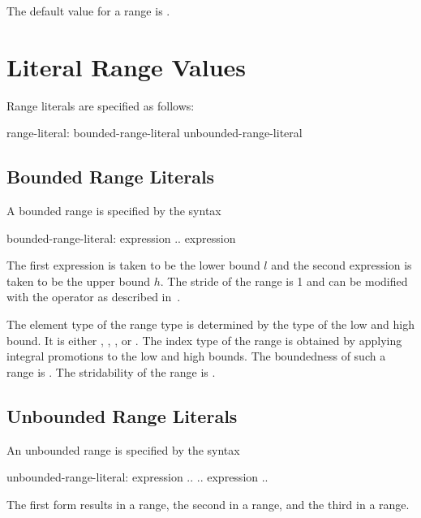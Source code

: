 The default value for a range is .

\section{Literal Range Values}
\label{Range_Literals}

Range literals are specified as follows:
\begin{syntax}
range-literal:
  bounded-range-literal
  unbounded-range-literal
\end{syntax}

\subsection{Bounded Range Literals}
\label{Bounded_Ranges}

A bounded range is specified by the syntax
\begin{syntax}
bounded-range-literal:
  expression .. expression
\end{syntax}
The first expression is taken to be the lower bound $l$ and the second
expression is taken to be the upper bound $h$.  The stride of the
range is 1 and can be modified with the  operator as described
in~.

The element type of the range type is determined by the type of the
low and high bound.  It is either , ,
, or .  The index type of the range is obtained by
applying integral promotions to the low and high bounds.  The boundedness
of such a range is .  The stridability of
the range is .

\subsection{Unbounded Range Literals}
\label{Unbounded_Ranges}

An unbounded range is specified by the syntax
\begin{syntax}
unbounded-range-literal:
  expression ..
  .. expression
  ..
\end{syntax}

The first form results in a  range, the
second in a  range, and the third in
a  range.

